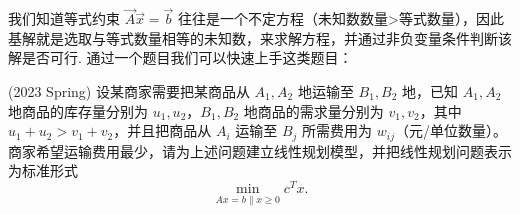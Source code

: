 我们知道等式约束 $\vec{A}\vec{x}=\vec{b}$ 往往是一个不定方程（未知数数量>等式数量），因此{\color{red} 基解就是选取与等式数量相等的未知数，来求解方程，并通过非负变量条件判断该解是否可行. } 通过一个题目我们可以快速上手这类题目：
\begin{problembox}
    \begin{example}
    (2023 Spring) 
    设某商家需要把某商品从 $A_1, A_2$ 地运输至 $B_1, B_2$ 地，已知 $A_1, A_2$ 地商品的库存量分别为 $u_1, u_2$，$B_1, B_2$ 地商品的需求量分别为 $v_1, v_2$，其中 $u_1 + u_2 > v_1 + v_2$，并且把商品从 $A_i$ 运输至 $B_j$ 所需费用为 $w_{ij}$（元/单位数量）。商家希望运输费用最少，请为上述问题建立线性规划模型，并把线性规划问题表示为标准形式
    \[ \min_{Ax=b \parallel x \geq 0} c^T x. \]
    \end{example}
    \begin{solution}
        
    \end{solution}
\end{problembox}

